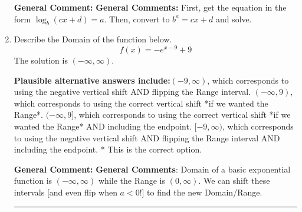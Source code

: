 \documentclass{extbook}[14pt]
\newcommand{\litem}[1]{\item #1

\rule{\textwidth}{0.4pt}}
\begin{document}
\begin{enumerate}
{\textbf{General Comment:} \textbf{General Comments:} First, get the equation in the form $\log_b{(cx+d)} = a$. Then, convert to $b^a = cx+d$ and solve.
}
\litem{
Describe the Domain of the function below.
\[ f(x) = -e^{x-9}+9 \]The solution is \( (-\infty, \infty) \).\begin{enumerate}[label=\Alph*.]
\textbf{Plausible alternative answers include:}$(-9, \infty)$, which corresponds to using the negative vertical shift AND flipping the Range interval.
$(-\infty, 9)$, which corresponds to using the correct vertical shift *if we wanted the Range*.
$(-\infty, 9]$, which corresponds to using the correct vertical shift *if we wanted the Range* AND including the endpoint.
$[-9, \infty)$, which corresponds to using the negative vertical shift AND flipping the Range interval AND including the endpoint.
* This is the correct option.
\end{enumerate}

\textbf{General Comment:} \textbf{General Comments}: Domain of a basic exponential function is $(-\infty, \infty)$ while the Range is $(0, \infty)$. We can shift these intervals [and even flip when $a<0$!] to find the new Domain/Range.
}
\end{enumerate}
\end{document}
